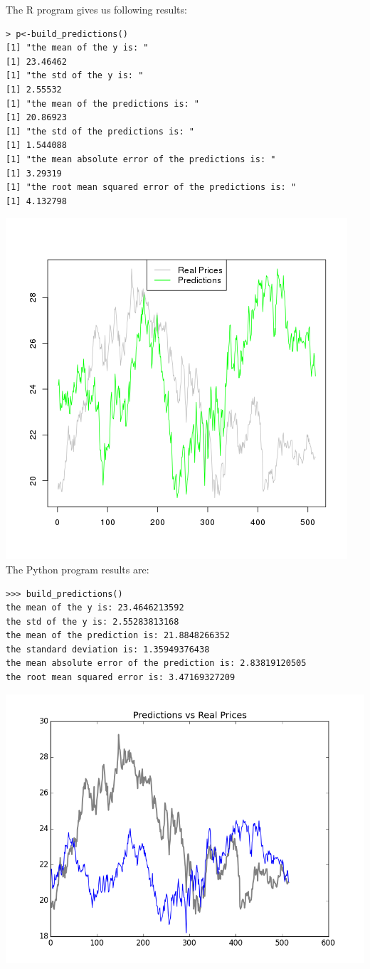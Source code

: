 \documentclass{article}
\begin{document}
The R program gives us following results:
\begin{verbatim}
> p<-build_predictions()
[1] "the mean of the y is: "
[1] 23.46462
[1] "the std of the y is: "
[1] 2.55532
[1] "the mean of the predictions is: "
[1] 20.86923
[1] "the std of the predictions is: "
[1] 1.544088
[1] "the mean absolute error of the predictions is: "
[1] 3.29319
[1] "the root mean squared error of the predictions is: "
[1] 4.132798
\end{verbatim}
\includegraphics[scale=0.75]{RPredicitions.png}
The Python program results are:
\begin{verbatim}
>>> build_predictions()
the mean of the y is: 23.4646213592
the std of the y is: 2.55283813168
the mean of the prediction is: 21.8848266352
the standard deviation is: 1.35949376438
the mean absolute error of the prediction is: 2.83819120505
the root mean squared error is: 3.47169327209
\end{verbatim}
\includegraphics[scale=0.75]{PythonPredictions.png}\\
\end{document}
